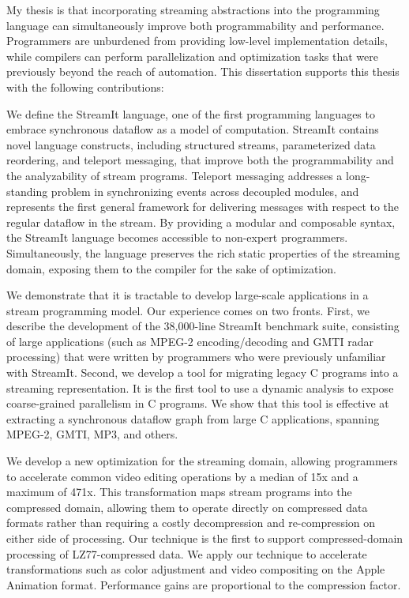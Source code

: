 \label{chap:conclusions}

My thesis is that incorporating streaming abstractions into the
programming language can simultaneously improve both programmability
and performance.  Programmers are unburdened from providing low-level
implementation details, while compilers can perform parallelization
and optimization tasks that were previously beyond the reach of
automation.  This dissertation supports this thesis with the following
contributions:

\mybegin

\item We define the StreamIt language, one of the first programming 
languages to embrace synchronous dataflow as a model of computation.
StreamIt contains novel language constructs, including structured
streams, parameterized data reordering, and teleport messaging, that
improve both the programmability and the analyzability of stream
programs.  Teleport messaging addresses a long-standing problem in
synchronizing events across decoupled modules, and represents the
first general framework for delivering messages with respect to the
regular dataflow in the stream.  By providing a modular and composable
syntax, the StreamIt language becomes accessible to non-expert
programmers.  Simultaneously, the language preserves the rich static
properties of the streaming domain, exposing them to the compiler for
the sake of optimization.

\item We demonstrate that it is tractable to develop large-scale 
applications in a stream programming model.  Our experience comes on
two fronts.  First, we describe the development of the 38,000-line
StreamIt benchmark suite, consisting of large applications (such as
MPEG-2 encoding/decoding and GMTI radar processing) that were written
by programmers who were previously unfamiliar with StreamIt.  Second,
we develop a tool for migrating legacy C programs into a streaming
representation.  It is the first tool to use a dynamic analysis to
expose coarse-grained parallelism in C programs.  We show that this
tool is effective at extracting a synchronous dataflow graph from
large C applications, spanning MPEG-2, GMTI, MP3, and others.

\item We develop a new optimization for the streaming domain, allowing 
programmers to accelerate common video editing operations by a median
of 15x and a maximum of 471x.  This transformation maps stream
programs into the compressed domain, allowing them to operate directly
on compressed data formats rather than requiring a costly
decompression and re-compression on either side of processing.  Our
technique is the first to support compressed-domain processing of
LZ77-compressed data.  We apply our technique to accelerate
transformations such as color adjustment and video compositing on the
Apple Animation format.  Performance gains are proportional to the
compression factor.

